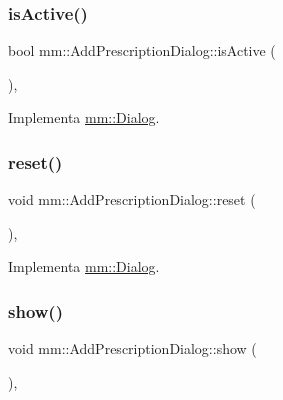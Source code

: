 \subsubsection{\texorpdfstring{is\+Active()}{isActive()}}
{\footnotesize\ttfamily bool mm\+::\+Add\+Prescription\+Dialog\+::is\+Active (\begin{DoxyParamCaption}{ }\end{DoxyParamCaption})\hspace{0.3cm}{\ttfamily [override]}, {\ttfamily [virtual]}}



Implementa \hyperlink{classmm_1_1_dialog_a22abaf4e90b6fdca5c20039f6b9e15ac}{mm\+::\+Dialog}.

\mbox{\label{classmm_1_1_add_prescription_dialog_a6ace04587432a197436bb04c7b68d60d}} 
\subsubsection{\texorpdfstring{reset()}{reset()}}
{\footnotesize\ttfamily void mm\+::\+Add\+Prescription\+Dialog\+::reset (\begin{DoxyParamCaption}{ }\end{DoxyParamCaption})\hspace{0.3cm}{\ttfamily [override]}, {\ttfamily [virtual]}}



Implementa \hyperlink{classmm_1_1_dialog_abe6e5ac072c12c06971f60491f079d80}{mm\+::\+Dialog}.

\mbox{\label{classmm_1_1_add_prescription_dialog_aa1c86141b2d45e141684bd99d557b8e4}} 
\subsubsection{\texorpdfstring{show()}{show()}}
{\footnotesize\ttfamily void mm\+::\+Add\+Prescription\+Dialog\+::show (\begin{DoxyParamCaption}{ }\end{DoxyParamCaption})\hspace{0.3cm}{\ttfamily [override]}, {\ttfamily [virtual]}}



